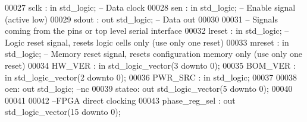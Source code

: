 \begin{DoxyCode}
00027         \textcolor{vhdlchar}{sclk}    \textcolor{vhdlchar}{:} \textcolor{keywordflow}{in} \textcolor{comment}{std\_logic};\textcolor{keyword}{     -- Data clock}
00028         \textcolor{vhdlchar}{sen} \textcolor{vhdlchar}{:} \textcolor{keywordflow}{in} \textcolor{comment}{std\_logic};\textcolor{keyword}{ -- Enable signal (active low)}
00029         \textcolor{vhdlchar}{sdout}   \textcolor{vhdlchar}{:} \textcolor{keywordflow}{out} \textcolor{comment}{std\_logic};\textcolor{keyword}{    -- Data out}
00030     
00031 \textcolor{keyword}{        -- Signals coming from the pins or top level serial interface}
00032         \textcolor{vhdlchar}{lreset}  \textcolor{vhdlchar}{:} \textcolor{keywordflow}{in} \textcolor{comment}{std\_logic};\textcolor{keyword}{     -- Logic reset signal, resets logic cells only  (use only one reset)}
00033         \textcolor{vhdlchar}{mreset}  \textcolor{vhdlchar}{:} \textcolor{keywordflow}{in} \textcolor{comment}{std\_logic};\textcolor{keyword}{     -- Memory reset signal, resets configuration memory only (use only one
       reset)}
00034         \textcolor{vhdlchar}{HW_VER}  \textcolor{vhdlchar}{:} \textcolor{keywordflow}{in} \textcolor{comment}{std\_logic\_vector}\textcolor{vhdlchar}{(}\textcolor{vhdllogic}{}\textcolor{vhdllogic}{3} \textcolor{keywordflow}{downto} \textcolor{vhdllogic}{}\textcolor{vhdllogic}{0}\textcolor{vhdlchar}{)};
00035         \textcolor{vhdlchar}{BOM_VER} \textcolor{vhdlchar}{:} \textcolor{keywordflow}{in} \textcolor{comment}{std\_logic\_vector}\textcolor{vhdlchar}{(}\textcolor{vhdllogic}{}\textcolor{vhdllogic}{2} \textcolor{keywordflow}{downto} \textcolor{vhdllogic}{}\textcolor{vhdllogic}{0}\textcolor{vhdlchar}{)};
00036         \textcolor{vhdlchar}{PWR_SRC} \textcolor{vhdlchar}{:} \textcolor{keywordflow}{in} \textcolor{comment}{std\_logic};
00037         
00038         \textcolor{vhdlchar}{oen}\textcolor{vhdlchar}{:} \textcolor{keywordflow}{out} \textcolor{comment}{std\_logic};\textcolor{keyword}{ --nc}
00039         \textcolor{vhdlchar}{stateo}\textcolor{vhdlchar}{:} \textcolor{keywordflow}{out} \textcolor{comment}{std\_logic\_vector}\textcolor{vhdlchar}{(}\textcolor{vhdllogic}{}\textcolor{vhdllogic}{5} \textcolor{keywordflow}{downto} \textcolor{vhdllogic}{}\textcolor{vhdllogic}{0}\textcolor{vhdlchar}{)};
00040         
00041         
00042 \textcolor{keyword}{        --FPGA direct clocking}
00043         \textcolor{vhdlchar}{phase_reg_sel}   \textcolor{vhdlchar}{:} \textcolor{keywordflow}{out} \textcolor{comment}{std\_logic\_vector}\textcolor{vhdlchar}{(}\textcolor{vhdllogic}{}\textcolor{vhdllogic}{15} \textcolor{keywordflow}{downto} \textcolor{vhdllogic}{}\textcolor{vhdllogic}{0}\textcolor{vhdlchar}{)};

\end{DoxyCode}
